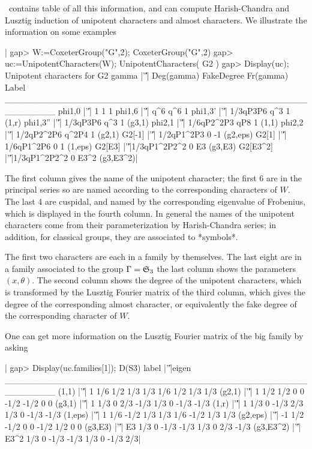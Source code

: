 \CHEVIE\   contains  table  of  all   this  information,  and  can  compute
Harish-Chandra  and  Lusztig  induction  of  unipotent characters and almost
characters. We illustrate the information on some examples\:

|    gap> W:=CoxeterGroup("G",2);
    CoxeterGroup("G",2)
    gap> uc:=UnipotentCharacters(W);
    UnipotentCharacters( G2 )
    gap> Display(uc);
    Unipotent characters for G2
         gamma |'\|'|  Deg(gamma) FakeDegree Fr(gamma)     Label
    ________________________________________________________
    phi{1,0}   |'\|'|           1          1         1
    phi{1,6}   |'\|'|         q^6        q^6         1
    phi{1,3}'  |'\|'|    1/3qP3P6        q^3         1     (1,r)
    phi{1,3}'' |'\|'|    1/3qP3P6        q^3         1    (g3,1)
    phi{2,1}   |'\|'|  1/6qP2^2P3        qP8         1     (1,1)
    phi{2,2}   |'\|'|  1/2qP2^2P6      q^2P4         1    (g2,1)
    G2[-1]     |'\|'|  1/2qP1^2P3          0        -1  (g2,eps)
    G2[1]      |'\|'|  1/6qP1^2P6          0         1   (1,eps)
    G2[E3]     |'\|'|1/3qP1^2P2^2          0        E3   (g3,E3)
    G2[E3^2]   |'\|'|1/3qP1^2P2^2          0      E3^2 (g3,E3^2)|

The first column gives the name of the unipotent character; the first 6 are
in  the  principal  series  so  are  named  according  to the corresponding
characters  of $W$. The last 4 are cuspidal, and named by the corresponding
eigenvalue  of  Frobenius,  which  is  displayed  in  the fourth column. In
general   the   names   of   the   unipotent  characters  come  from  their
parameterization  by  Harish-Chandra  series;  in  addition,  for  classical
groups, they are associated to *symbols*.

The first two characters are each in a family by themselves. The last eight
are  in a family associated to  the group $\Gamma={\mathfrak S}_3$\: the last column
shows  the parameters $(x,\theta)$.  The second column  shows the degree of
the  unipotent  characters,  which  is  transformed  by the Lusztig Fourier
matrix  of the  third column,  which gives  the degree of the corresponding
almost  character,  or  equivalently  the  fake degree of the corresponding
character of $W$.

One can get more information on the Lusztig Fourier matrix of the big family
by asking

|    gap> Display(uc.families[1]);
    D(S3)
        label |'\|'|eigen
    ________________________________________________________
    (1,1)     |'\|'|    1 1/6  1/2  1/3  1/3  1/6  1/2  1/3  1/3
    (g2,1)    |'\|'|    1 1/2  1/2    0    0 -1/2 -1/2    0    0
    (g3,1)    |'\|'|    1 1/3    0  2/3 -1/3  1/3    0 -1/3 -1/3
    (1,r)     |'\|'|    1 1/3    0 -1/3  2/3  1/3    0 -1/3 -1/3
    (1,eps)   |'\|'|    1 1/6 -1/2  1/3  1/3  1/6 -1/2  1/3  1/3
    (g2,eps)  |'\|'|   -1 1/2 -1/2    0    0 -1/2  1/2    0    0
    (g3,E3)   |'\|'|   E3 1/3    0 -1/3 -1/3  1/3    0  2/3 -1/3
    (g3,E3^2) |'\|'| E3^2 1/3    0 -1/3 -1/3  1/3    0 -1/3  2/3|

